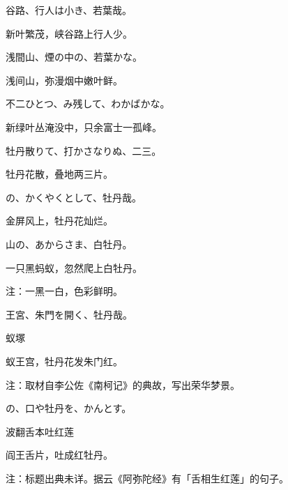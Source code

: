 \begin{haiku}
    {\FH 谷路、行人は小き、若葉哉。}

    {\FK 新叶繁茂，峡谷路上行人少。}
\end{haiku}

\begin{haiku}
    {\FH 浅間山、煙の中の、若葉かな。}

    {\FK 浅间山，弥漫烟中嫩叶鲜。}
\end{haiku}

\begin{haiku}
    {\FH 不二ひとつ、み残して、わかばかな。}

    {\FK 新绿叶丛淹没中，只余富士一孤峰。}
\end{haiku}

\begin{haiku}
    {\FH 牡丹散りて、打かさなりぬ、二三。}

    {\FK 牡丹花散，叠地两三片。}
\end{haiku}

\begin{haiku}
    {\FH {}の、かくやくとして、牡丹哉。}

    {\FK 金屏风上，牡丹花灿烂。}
\end{haiku}

\begin{haiku}
    {\FH 山の、あからさま、白牡丹。}

    {\FK 一只黑蚂蚁，忽然爬上白牡丹。}

    {\FT 注：一黑一白，色彩鲜明。}
\end{haiku}

\begin{haiku}
    {\FH {}王宮、朱門を開く、牡丹哉。}

    {\FK 蚁塚}

    {\FK 蚁王宫，牡丹花发朱门红。}

    {\FT 注：取材自李公佐《南柯记》的典故，写出荣华梦景。}
\end{haiku}

\begin{haiku}
    {\FH {}の、口や牡丹を、かんとす。}

    {\FK 波翻舌本吐红莲}

    {\FK 阎王舌片，吐成红牡丹。}

    {\FT 注：标题出典未详。据云《阿弥陀经》有「舌相生红莲」的句子。}
\end{haiku}


